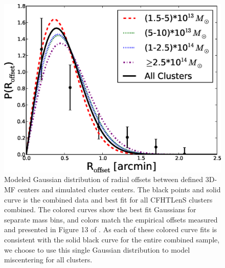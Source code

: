 \begin{figure}
\begin{center}
\includegraphics[scale=0.6]{plots_ch3/PofRc_bestfit_python.eps}
\caption[Centroid Offset Model]{Modeled Gaussian distribution of radial offsets between defined \ac{3D-MF} centers and simulated cluster centers. The black points and solid curve is the combined data and best fit for all \ac{CFHTLenS} clusters combined. The colored curves show the best fit Gaussians for separate mass bins, and colors match the empirical offsets measured and presented in Figure 13 of \citet{Milkeraitis10}. As each of these colored curve fits is consistent with the solid black curve for the entire combined sample, we choose to use this single Gaussian distribution to model miscentering for all clusters.}
\label{gauss}
\end{center}
\end{figure}

\begin{table}
  \begin{center}
    \caption[Centroid Offset Fit Parameters]{Best Fit Gaussian Distributions for the Cluster Miscentering in Figure \ref{gauss}.}
  \end{center}
\end{table}

